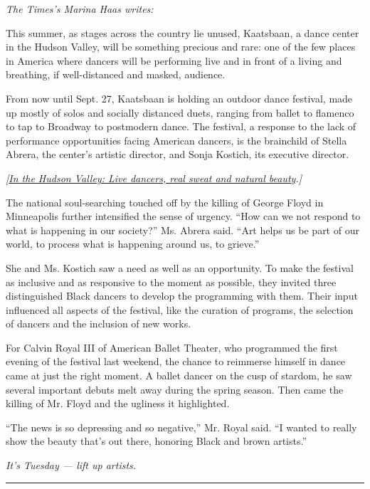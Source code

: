 \emph{The Times's Marina Haas writes:}

This summer, as stages across the country lie unused, Kaatsbaan, a dance
center in the Hudson Valley, will be something precious and rare: one of
the few places in America where dancers will be performing live and in
front of a living and breathing, if well-distanced and masked, audience.

From now until Sept. 27, Kaatsbaan is holding an outdoor dance festival,
made up mostly of solos and socially distanced duets, ranging from
ballet to flamenco to tap to Broadway to postmodern dance. The festival,
a response to the lack of performance opportunities facing American
dancers, is the brainchild of Stella Abrera, the center's artistic
director, and Sonja Kostich, its executive director.

\emph{{[}}\href{https://www.nytimes3xbfgragh.onion/2020/07/29/arts/dance/kaatsbaan-dance-festival-stella-abrera.html}{\emph{In
the Hudson Valley: Live dancers, real sweat and natural
beauty}}\emph{.{]}}

The national soul-searching touched off by the killing of George Floyd
in Minneapolis further intensified the sense of urgency. ``How can we
not respond to what is happening in our society?'' Ms. Abrera said.
``Art helps us be part of our world, to process what is happening around
us, to grieve.''

She and Ms. Kostich saw a need as well as an opportunity. To make the
festival as inclusive and as responsive to the moment as possible, they
invited three distinguished Black dancers to develop the programming
with them. Their input influenced all aspects of the festival, like the
curation of programs, the selection of dancers and the inclusion of new
works.

For Calvin Royal III of American Ballet Theater, who programmed the
first evening of the festival last weekend, the chance to reimmerse
himself in dance came at just the right moment. A ballet dancer on the
cusp of stardom, he saw several important debuts melt away during the
spring season. Then came the killing of Mr. Floyd and the ugliness it
highlighted.

``The news is so depressing and so negative,'' Mr. Royal said. ``I
wanted to really show the beauty that's out there, honoring Black and
brown artists.''

\emph{It's Tuesday --- lift up artists.}

\begin{center}\rule{0.5\linewidth}{\linethickness}\end{center}

